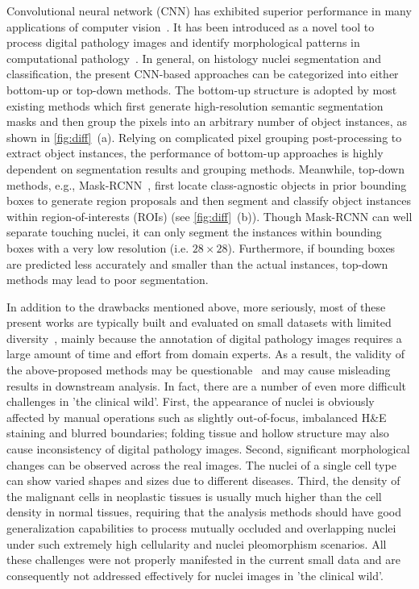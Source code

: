 \documentclass[lettersize,journal]{IEEEtran}
\begin{document}
Convolutional neural network (CNN) has exhibited superior performance in many applications of computer vision~\cite{ETCI1,ETCI2}. It has been introduced as a novel tool to process digital pathology images and identify morphological patterns in computational pathology~\cite{bera2019artificial,song2018contour,liu2021panoptic}. In general, on histology nuclei segmentation and classification, the present CNN-based approaches can be categorized into either bottom-up or top-down methods. The bottom-up structure is adopted by most existing methods \cite{kumar,dist,hovernet,cianet,tripleunet} which first generate high-resolution semantic segmentation masks and then group the pixels into an arbitrary number of object instances, as shown in \autoref{fig:diff}~(a). Relying on complicated pixel grouping post-processing to extract object instances, the performance of bottom-up approaches is highly dependent on segmentation results and grouping methods. Meanwhile, top-down methods, e.g., Mask-RCNN~\cite{maskrcnn}, first locate class-agnostic objects in prior bounding boxes to generate region proposals and then segment and classify object instances within region-of-interests (ROIs) (see \autoref{fig:diff}~(b)). Though Mask-RCNN can well separate touching nuclei, it can only segment the instances within bounding boxes with a very low resolution (i.e. $28\times28$). Furthermore, if bounding boxes are predicted less accurately and smaller than the actual instances, top-down methods may lead to poor segmentation. 

In addition to the drawbacks mentioned above, more seriously, most of these present works are typically built and evaluated on small datasets with limited diversity~\cite{kumar,hovernet}, mainly because the annotation of digital pathology images requires a large amount of time and effort from domain experts. 
As a result, the validity of the above-proposed methods may be  questionable~\cite{quest} and may cause misleading results in downstream analysis. In fact, there are a number of even more difficult challenges in 'the clinical wild'. First, the appearance of nuclei is obviously affected by manual operations such as slightly out-of-focus, imbalanced H\&E staining and blurred boundaries; folding tissue and hollow structure may also cause inconsistency of digital pathology images. Second, significant morphological changes can be observed across the real images. The nuclei of a single cell type can show varied shapes and sizes due to different diseases. Third, the density of the malignant cells in neoplastic tissues is usually much higher than the cell density in normal tissues, requiring that the analysis methods should have good generalization capabilities to process mutually occluded and overlapping nuclei under such extremely high cellularity and nuclei pleomorphism scenarios. All these challenges were not properly manifested in the current small data and are consequently not addressed effectively for nuclei images in 'the clinical wild'.
\end{document}

